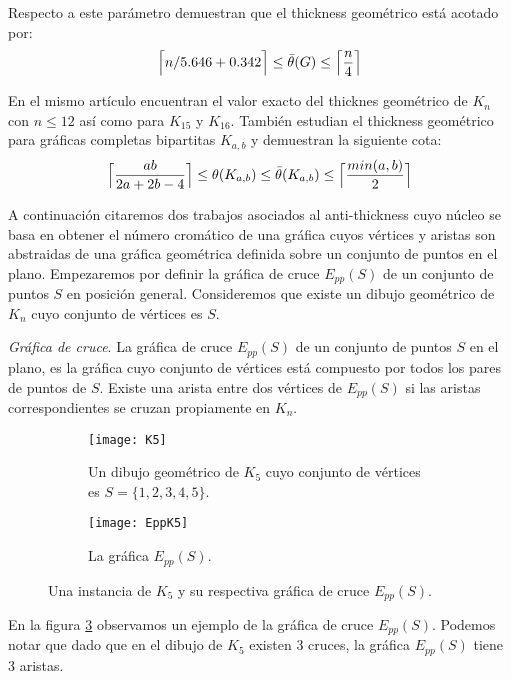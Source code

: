 Respecto a este parámetro \cite{Dillencourt2004} demuestran que el thickness
geométrico está acotado por:
\[ \Bigl\lceil n/5.646 + 0.342 \Bigr\rceil \leq  \bar{\theta}(G) \leq \Bigl\lceil\frac{n}{4}\Bigr\rceil \]

En el mismo artículo encuentran el valor exacto del thicknes geométrico
de $K_n$ con $n\leq 12$ así como para $K_{15}$ y $K_{16}$. También
estudian el thickness geométrico para gráficas completas bipartitas $K_{a,b}$ y demuestran la
siguiente cota:
\[
  \Bigl\lceil \frac{ab}{2a+2b-4} \Bigr\rceil \leq \theta(K_{a,b}) \leq \bar{\theta}(K_{a,b})
  \leq \Bigl\lceil \frac{min(a,b)}{2} \Bigr\rceil
\]

A continuación citaremos dos trabajos asociados al anti-thickness cuyo núcleo
se basa en obtener el número cromático de una gráfica cuyos vértices y aristas
son abstraidas de una gráfica geométrica definida sobre un conjunto de puntos
en el plano. Empezaremos por definir la gráfica de cruce $E_{pp}(S)$ de un conjunto
de puntos $S$ en posición general. Consideremos que existe un dibujo geométrico
de $K_n$ cuyo conjunto de vértices es $S$.
\begin{definition}{\emph{Gráfica de cruce}.}
  La gráfica de cruce $E_{pp}(S)$ de un conjunto de puntos $S$ en el plano, es
  la gráfica cuyo conjunto de vértices está compuesto por todos los pares de puntos
  de $S$. Existe una arista entre dos vértices de $E_{pp}(S)$ si las aristas correspondientes
  se cruzan propiamente en $K_n$.
\end{definition}

\begin{figure}
\begin{subfigure}{.5\textwidth}
  \centering
  \texttt{[image: K5]}
  \caption{Un dibujo geométrico de $K_5$ cuyo conjunto de vértices es $S=\{1,2,3,4,5\}$.}
  \label{fig:k5}
\end{subfigure}%
\begin{subfigure}{.5\textwidth}
  \centering
  \texttt{[image: EppK5]}
  \caption{La gráfica $E_{pp}(S)$.}
  \label{fig:eppk5}
\end{subfigure}
\caption{Una instancia de $K_5$ y su respectiva gráfica de cruce $E_{pp}(S)$.}
\label{fig:ejemploeppk5}
\end{figure}

En la figura \ref{fig:ejemploeppk5} observamos un ejemplo de la gráfica de cruce $E_{pp}(S)$.
Podemos notar que dado que en el dibujo de $K_5$ existen 3 cruces, la gráfica $E_{pp}(S)$
tiene 3 aristas.

